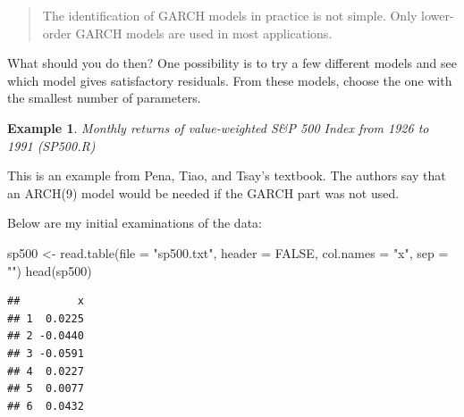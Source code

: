 \documentclass[
]{book}
\newenvironment{Shaded}{\begin{snugshade}}{\end{snugshade}}
\newcommand{\AttributeTok}[1]{\textcolor[rgb]{0.77,0.63,0.00}{#1}}
\newcommand{\ConstantTok}[1]{\textcolor[rgb]{0.00,0.00,0.00}{#1}}
\newcommand{\FunctionTok}[1]{\textcolor[rgb]{0.00,0.00,0.00}{#1}}
\newcommand{\NormalTok}[1]{#1}
\newcommand{\OtherTok}[1]{\textcolor[rgb]{0.56,0.35,0.01}{#1}}
\newcommand{\SpecialCharTok}[1]{\textcolor[rgb]{0.00,0.00,0.00}{#1}}
\newcommand{\StringTok}[1]{\textcolor[rgb]{0.31,0.60,0.02}{#1}}
\theoremstyle{definition}
\theoremstyle{definition}
\newtheorem{example}{Example}[chapter]
\theoremstyle{definition}
\theoremstyle{definition}
\theoremstyle{remark}
\begin{document}
\begin{quote}
The identification of GARCH models in practice is not simple. Only lower-order GARCH models are used in most applications.
\end{quote}

What should you do then? One possibility is to try a few different models and see which model gives satisfactory residuals. From these models, choose the one with the smallest number of parameters.

\begin{example}
\emph{Monthly returns of value-weighted S\&P 500 Index from 1926 to 1991 (SP500.R)}

This is an example from Pena, Tiao, and Tsay's textbook. The authors say that an ARCH(9) model would be needed if the GARCH part was not used.

Below are my initial examinations of the data:

\begin{Shaded}
\begin{Highlighting}[]
\NormalTok{sp500 }\OtherTok{\textless{}{-}} \FunctionTok{read.table}\NormalTok{(}\AttributeTok{file =} \StringTok{"sp500.txt"}\NormalTok{, }\AttributeTok{header =} \ConstantTok{FALSE}\NormalTok{, }
   \AttributeTok{col.names =} \StringTok{"x"}\NormalTok{, }\AttributeTok{sep =} \StringTok{""}\NormalTok{) }
\FunctionTok{head}\NormalTok{(sp500)}
\end{Highlighting}
\end{Shaded}

\begin{verbatim}
##         x
## 1  0.0225
## 2 -0.0440
## 3 -0.0591
## 4  0.0227
## 5  0.0077
## 6  0.0432
\end{verbatim}

\begin{Shaded}
\end{Shaded}


\end{example}
\end{document}
